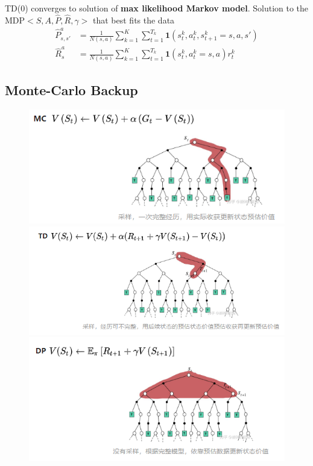 \documentclass[12pt, a4paper]{paper}
\begin{document}
TD(0) converges to solution of \textbf{max likelihood Markov model}.
Solution to the MDP$<S, A, \hat{P}, \hat{R}, \gamma>$ that best fits the data
\begin{equation*}
	\begin{aligned}
		\hat{P}_{s,s'}^{a} &= \frac{1}{N(s,a)}\sum_{k=1}^{K} \sum_{t=1}^{T_{k}} \textbf{1}(s_{t}^{k}, a_{t}^{k},s_{t+1}^k = s, a, s')\\
		\hat{R}_{s}^{a} &= \frac{1}{N(s,a)}\sum_{k=1}^{K} \sum_{t=1}^{T_{k}} \textbf{1}(s_{t}^{k}, a_{t}^{k} = s, a)r_{t}^{k}
	\end{aligned}
\end{equation*}

\subsection{Monte-Carlo Backup}
\begin{figure}[h]
	\begin{center}
		\includegraphics[width=\linewidth]{MCbackup.png}
		\includegraphics[width=\linewidth]{TDbackup.png}
		\includegraphics[width=\linewidth]{DPbackup.png}
	\end{center}
\end{figure}
\end{document}

